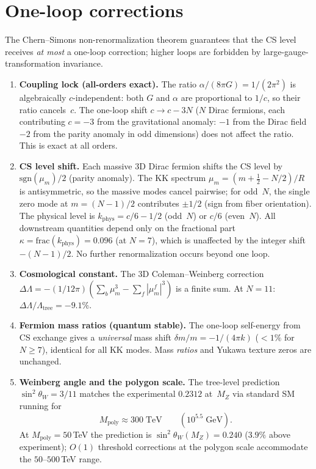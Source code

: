\section{One-loop corrections}
\label{sec:loops}

The Chern--Simons non-renormalization theorem guarantees
that the CS level receives \emph{at most} a one-loop correction;
higher loops are forbidden by large-gauge-transformation invariance.

\begin{proposition}
\label{prop:one-loop}
\leavevmode
\begin{enumerate}
\item \textbf{Coupling lock (all-orders exact).}
  The ratio $\alpha/(8\pi G) = 1/(2\pi^2)$ is algebraically
  $c$-independent: both $G$ and $\alpha$ are proportional to
  $1/c$, so their ratio cancels~$c$.
  The one-loop shift $c \to c - 3N$
  ($N$ Dirac fermions, each contributing $c = -3$ from the
  gravitational anomaly: $-1$ from the Dirac field
  $-2$ from the parity anomaly in odd dimensions)
  does not affect the ratio.  This is exact at all orders.
\item \textbf{CS level shift.}
  Each massive $3$D Dirac fermion shifts the CS level
  by $\mathrm{sgn}(\mu_m)/2$ (parity anomaly).
  The KK spectrum $\mu_m = (m{+}\tfrac{1}{2}{-}N/2)/R$
  is antisymmetric, so the massive modes cancel pairwise;
  for odd~$N$, the single zero mode at $m = (N{-}1)/2$
  contributes $\pm 1/2$ (sign from fiber orientation).
  The physical level is $k_{\mathrm{phys}} = c/6 - 1/2$
  (odd~$N$) or $c/6$ (even~$N$).
  All downstream quantities depend only on the
  fractional part $\kappa = \mathrm{frac}(k_{\mathrm{phys}})
  = 0.096$ (at $N = 7$), which is unaffected by the
  integer shift $-(N{-}1)/2$.
  No further renormalization occurs beyond one loop.
\item \textbf{Cosmological constant.}
  The 3D Coleman--Weinberg correction
  $\Delta\Lambda = -(1/12\pi)(\sum_b \mu_m^3 - \sum_f |\mu^f_m|^3)$
  is a finite sum.
  At $N = 11$: $\Delta\Lambda/\Lambda_{\mathrm{tree}} = -9.1\%$.
\item \textbf{Fermion mass ratios (quantum stable).}
  The one-loop self-energy from CS exchange gives a
  \emph{universal} mass shift $\delta m / m = -1/(4\pi k)$
  ($< 1\%$ for $N \ge 7$), identical for all KK modes.
  Mass \emph{ratios} and Yukawa texture zeros are unchanged.
\item \textbf{Weinberg angle and the polygon scale.}
  The tree-level prediction $\sin^2\theta_W = 3/11$ matches the
  experimental $0.2312$ at~$M_Z$ via standard SM running for
  \begin{equation}\label{eq:M-poly}
    M_{\mathrm{poly}} \approx 300\;\mathrm{TeV}
    \qquad (10^{5.5}\;\mathrm{GeV}).
  \end{equation}
  At $M_{\mathrm{poly}} = 50$\,TeV the prediction is
  $\sin^2\theta_W(M_Z) = 0.240$ ($3.9\%$ above experiment);
  $O(1)$ threshold corrections at the polygon scale
  accommodate the $50$--$500$\,TeV range.
\end{enumerate}
\end{proposition}

